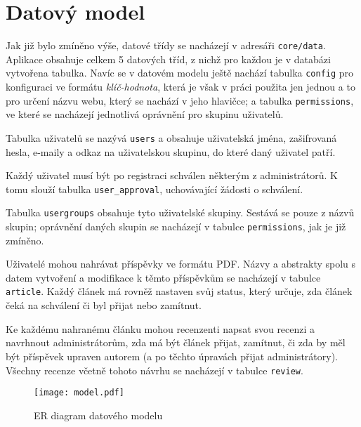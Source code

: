 \section{Datový model}

Jak již bylo zmíněno výše, datové třídy se nacházejí v adresáři
\verb|core/data|. Aplikace obsahuje celkem 5 datových tříd, z nichž pro každou
je v databázi vytvořena tabulka. Navíc se v datovém modelu ještě nachází
tabulka \verb|config| pro konfiguraci ve formátu \textit{klíč-hodnota}, která je
však v práci použita jen jednou a to pro určení názvu webu, který se nachází
v jeho hlavičce; a tabulka \verb|permissions|, ve které se nacházejí jednotlivá
oprávnění pro skupinu uživatelů.

Tabulka uživatelů se nazývá \verb|users| a obsahuje uživatelská jména,
zašifrovaná hesla, e-maily a odkaz na uživatelskou skupinu, do které daný
uživatel patří.

Každý uživatel musí být po registraci schválen některým z administrátorů.
K tomu slouží tabulka \verb|user_approval|, uchovávající žádosti o schválení.

Tabulka \verb|usergroups| obsahuje tyto uživatelské skupiny. Sestává se pouze
z názvů skupin; oprávnění daných skupin se nacházejí v tabulce
\verb|permissions|, jak je již zmíněno.

Uživatelé mohou nahrávat příspěvky ve formátu PDF. Názvy a abstrakty spolu
s datem vytvoření a modifikace k těmto příspěvkům se nacházejí v tabulce
\verb|article|. Každý článek má rovněž nastaven svůj status, který určuje,
zda článek čeká na schválení či byl přijat nebo zamítnut.

Ke každému nahranému článku mohou recenzenti napsat svou recenzi a navrhnout
administrátorům, zda má být článek přijat, zamítnut, či zda by měl být příspěvek
upraven autorem (a po těchto úpravách přijat administrátory). Všechny recenze
včetně tohoto návrhu se nacházejí v tabulce \verb|review|.

\begin{figure}[h!]
  \texttt{[image: model.pdf]}
  \caption{ER diagram datového modelu}
  \label{fig:erdiagram}
\end{figure}
